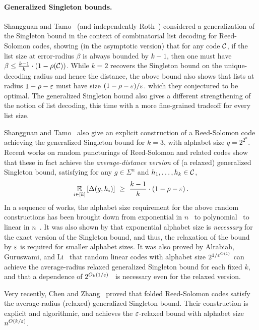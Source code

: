 \paragraph{Generalized Singleton bounds.}
%
Shangguan and Tamo~\cite{ST20} (and independently Roth~\cite{Rot24}) considered a generalization of the Singleton bound in the context of combinatorial list decoding for Reed-Solomon codes, showing (in the asymptotic version) that for any code ${\mathcal C}$, if the list size at error-radius $\beta$ is always bounded by $k-1$, then one must have $\beta \leq \frac{k-1}{k} \cdot (1 - \rho({\mathcal C}))$. 
%
While $k=2$ recovers the Singleton bound on the unique-decoding radius and hence the distance, the above bound also shows that lists at radius $1 - \rho - \varepsilon$ must have size $(1-\rho - \varepsilon)/\varepsilon$. which they conjectured to be optimal.
%
The generalized Singleton bound also gives a different strengthening of the notion of list decoding, this time with a more fine-grained tradeoff for every list size.

Shangguan and Tamo~\cite{ST20}  also give an explicit construction of a Reed-Solomon code achieving the generalized Singleton bound for $k=3$, with alphabet size $q = 2^{2^n}$. 
%
Recent works on random puncturings of Reed-Solomon and related codes show that these in fact achieve the \emph{average-distance version} of (a relaxed) generalized Singleton bound, satisfying for any $g \in \Sigma^n$ and $h_1, \ldots, h_{k} \in {\mathcal C}$,
\[
\Ex{i \in [k]}{\Delta(g,h_i)} ~\geq~ \frac{k-1}{k} \cdot (1 - \rho - \eps) \mper
\]
In a sequence of works, the alphabet size requirement for the above random constructions has been brought down from exponential in $n$~\cite{BGM23} to polynomial~\cite{GZ23} to linear in $n$~\cite{AGL24}.
%
It was also shown by \cite{BDG24} that exponential alphabet size is \emph{necessary} for the exact version of the Singleton bound, and thus, the relaxation of the bound by $\varepsilon$ is required for smaller alphabet sizes.
%
It was also proved by Alrabiah, Guruswami, and Li~\cite{AGL24} that random linear codes with alphabet size $2^{1/\varepsilon^{O(1)}}$ can achieve the average-radius relaxed generalized Singleton bound for each fixed $k$, and that a dependence of $2^{O_k(1/\varepsilon)}$~\cite{AGL24:alphabet} is necessary even for the relaxed version.

Very recently, Chen and Zhang~\cite{CZ24} proved that folded Reed-Solomon codes satisfy the average-radius (relaxed) generalized Singleton bound.
%
Their construction is explicit and algorithmic, and achieves the $\varepsilon$-relaxed bound with alphabet size $n^{O(k/\varepsilon)}$.


